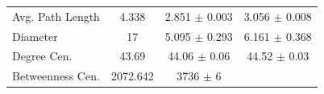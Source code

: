 \documentclass[12pt,twoside]{amherstthesis}
\begin{document}
\begin{longtable}[]{@{}lccc@{}}
\begin{minipage}[t]{0.20\columnwidth}
  Avg. Path Length\strut
  \end{minipage} & \begin{minipage}[t]{0.12\columnwidth}\centering\strut
  4.338\strut
  \end{minipage} & \begin{minipage}[t]{0.27\columnwidth}\centering\strut
  2.851 \(\pm\) 0.003\strut
  \end{minipage} & \begin{minipage}[t]{0.29\columnwidth}\centering\strut
  3.056 \(\pm\) 0.008\strut
  \end{minipage}\tabularnewline
  \begin{minipage}[t]{0.20\columnwidth}\raggedright\strut
  Diameter\strut
  \end{minipage} & \begin{minipage}[t]{0.12\columnwidth}\centering\strut
  17\strut
  \end{minipage} & \begin{minipage}[t]{0.27\columnwidth}\centering\strut
  5.095 \(\pm\) 0.293\strut
  \end{minipage} & \begin{minipage}[t]{0.29\columnwidth}\centering\strut
  6.161 \(\pm\) 0.368\strut
  \end{minipage}\tabularnewline
  \begin{minipage}[t]{0.20\columnwidth}\raggedright\strut
  Degree Cen.\strut
  \end{minipage} & \begin{minipage}[t]{0.12\columnwidth}\centering\strut
  43.69\strut
  \end{minipage} & \begin{minipage}[t]{0.27\columnwidth}\centering\strut
  44.06 \(\pm\) 0.06\strut
  \end{minipage} & \begin{minipage}[t]{0.29\columnwidth}\centering\strut
  44.52 \(\pm\) 0.03\strut
  \end{minipage}\tabularnewline
  \begin{minipage}[t]{0.20\columnwidth}\raggedright\strut
  Betweenness Cen.\strut
  \end{minipage} & \begin{minipage}[t]{0.12\columnwidth}\centering\strut
  2072.642\strut
  \end{minipage} & \begin{minipage}[t]{0.27\columnwidth}\centering\strut
  3736 \(\pm\) 6\strut
  \end{minipage} & \begin{minipage}[t]{0.29\columnwidth}\centering\strut

\end{minipage}
\end{longtable}
\end{document}
